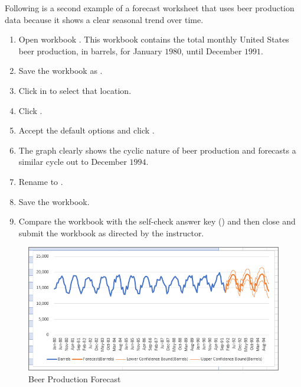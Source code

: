 Following is a second example of a forecast worksheet that uses beer production data because it shows a clear seasonal trend over time.

\begin{enumerate}
	\item Open workbook . This workbook contains the total monthly United States beer production, in barrels, for January $ 1980 $, until December $ 1991 $. 
	\item Save the workbook as .
	\item Click in  to select that location.
	\item Click .
	\item Accept the default options and click .
	\item The graph clearly shows the cyclic nature of beer production and forecasts a similar cycle out to December $ 1994 $.
	\item Rename  to .
	\item Save the  workbook.
	\item Compare the workbook with the self-check answer key () and then close and submit the  workbook as directed by the instructor.
	
\end{enumerate}

\begin{figure}[H]
	\centering
	\includegraphics[width=\maxwidth{.95\linewidth}]{gfx/ch08_fig13}
	\caption{Beer Production Forecast}
	\label{08:fig13}
\end{figure}

